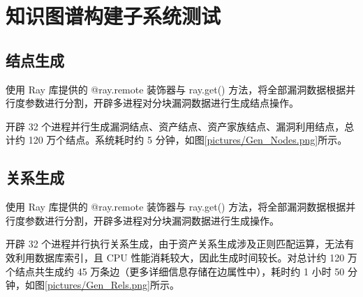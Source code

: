 \documentclass[a4paper,AutoFakeBold,oneside,12pt]{book}
\begin{document}
\section{知识图谱构建子系统测试}

\subsection{结点生成}

使用 Ray 库提供的 @ray.remote 装饰器与 ray.get() 方法，将全部漏洞数据根据并行度参数进行分割，开辟多进程对分块漏洞数据进行生成结点操作。

开辟 32 个进程并行生成漏洞结点、资产结点、资产家族结点、漏洞利用结点，总计约 120 万个结点。系统耗时约 5 分钟，如图\ref{pictures/Gen_Nodes.png}所示。



\subsection{关系生成}

使用 Ray 库提供的 @ray.remote 装饰器与 ray.get() 方法，将全部漏洞数据根据并行度参数进行分割，开辟多进程对分块漏洞数据进行生成操作。

开辟 32 个进程并行执行关系生成，由于资产关系生成涉及正则匹配运算，无法有效利用数据库索引，且 CPU 性能消耗较大，因此生成时间较长。对总计约 120 万个结点共生成约 45 万条边（更多详细信息存储在边属性中），耗时约 1 小时 50 分钟，如图\ref{pictures/Gen_Rels.png}所示。

\end{document}
